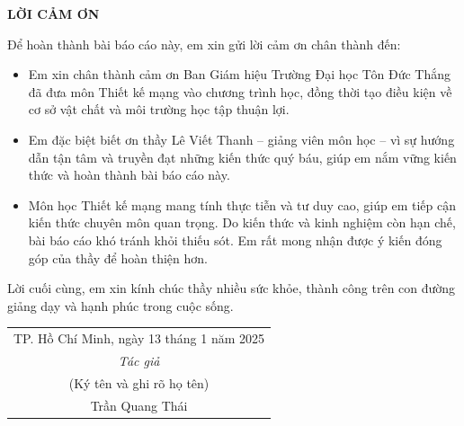 \begin{center}
\pagestyle{empty}  %
\Large \textbf{LỜI CẢM ƠN}
\end{center}
    Để hoàn thành bài báo cáo này, em xin gửi lời cảm ơn chân thành đến:

    \begin{itemize}
        \item Em xin chân thành cảm ơn Ban Giám hiệu Trường Đại học Tôn Đức Thắng đã đưa môn Thiết kế mạng vào chương trình học, đồng thời tạo điều kiện về cơ sở vật chất và môi trường học tập thuận lợi.
        \item Em đặc biệt biết ơn thầy Lê Viết Thanh – giảng viên môn học – vì sự hướng dẫn tận tâm và truyền đạt những kiến thức quý báu, giúp em nắm vững kiến thức và hoàn thành bài báo cáo này.
        \item Môn học Thiết kế mạng mang tính thực tiễn và tư duy cao, giúp em tiếp cận kiến thức chuyên môn quan trọng. Do kiến thức và kinh nghiệm còn hạn chế, bài báo cáo khó tránh khỏi thiếu sót. Em rất mong nhận được ý kiến đóng góp của thầy để hoàn thiện hơn.
    \end{itemize}

    Lời cuối cùng, em xin kính chúc thầy nhiều sức khỏe, thành công trên con đường giảng dạy và hạnh phúc trong cuộc sống.

    \vspace{2cm} %

    \begin{flushright}
\begin{tabular}{c}
    \multicolumn{1}{r}{TP. Hồ Chí Minh, ngày 13 tháng 1 năm 2025}\\
    \noalign{\vspace{0.5cm}}
    \textit{Tác giả} \\
    (Ký tên và ghi rõ họ tên) \\
    \noalign{\vspace{2cm}}
    Trần Quang Thái \\
\end{tabular}


\end{flushright}